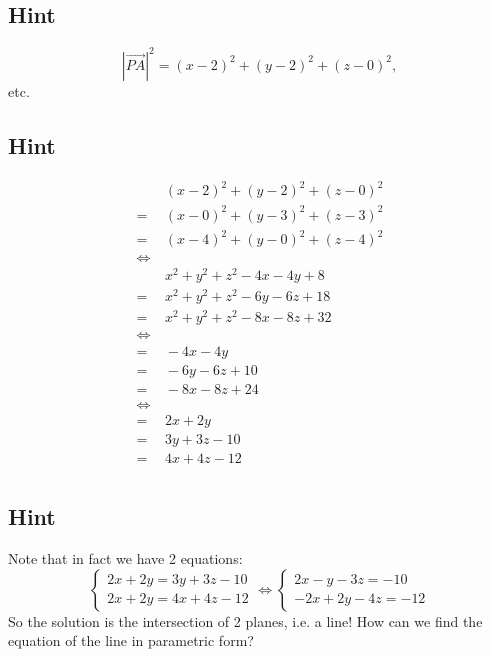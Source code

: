 \documentclass[a4paper,10pt]{article}
\begin{document}
\subsection{Hint}
\[
    \left|\overrightarrow{PA}\right|^2 = (x-2)^2 + (y-2)^2 +(z-0)^2,
\]
etc.

\subsection{Hint}
\begin{align*}
         & \ (x-2)^2 + (y-2)^2 + (z-0)^2    \\
    =    & \ (x-0)^2 + (y-3)^2 + (z-3)^2    \\
    =    & \ (x-4)^2 + (y-0)^2 + (z-4)^2    \\
    \iff &                                  \\
         & \ x^2 + y^2 + z^2 - 4x - 4y + 8  \\
    =    & \ x^2 + y^2 + z^2 - 6y - 6z + 18 \\
    =    & \ x^2 + y^2 + z^2 - 8x - 8z + 32 \\
    \iff &                                  \\
    =    & \ - 4x - 4y                      \\
    =    & \ - 6y - 6z + 10                 \\
    =    & \ - 8x - 8z + 24                 \\
    \iff &                                  \\
    =    & \ 2x + 2y                        \\
    =    & \ 3y + 3z - 10                   \\
    =    & \ 4x + 4z - 12                   \\
\end{align*}

\subsection{Hint}
Note that in fact we have 2 equations:
\[
    \begin{cases}
        2x + 2y = 3y + 3z - 10 \\
        2x + 2y = 4x + 4z - 12
    \end{cases} \iff \begin{cases}
        2x - y - 3z = -10 \\
        -2x + 2y - 4z = -12
    \end{cases}
\]
So the solution is the intersection of 2 planes, i.e. a line! How can we find the equation of the line in parametric form?
\end{document}

